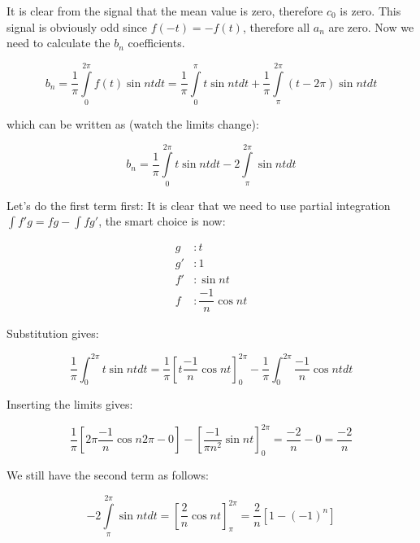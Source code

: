 \documentclass[11pt,letterpaper]{article}
\begin{document}
It is clear from the signal that the mean value is zero, therefore $c_0$ is zero. This signal is obviously odd since $f(-t) = -f(t)$, therefore all $a_n$ are zero. Now we need to calculate the $b_n$ coefficients.

\begin{equation}\label{HW_FourierSeries8}
 b_n = \frac{1}{\pi }\int\limits_{0}^{2\pi }{f\left( t \right)\sin ntdt} = \frac{1}{\pi}\int\limits_{0}^{\pi}{t \sin nt dt} + \frac{1}{\pi }\int\limits_{\pi}^{2\pi}{(t- 2 \pi) \sin nt dt}
\end{equation}

which can be written as (watch the limits change):

\begin{equation}\label{HW_FourierSeries9}
 b_n = \frac{1}{\pi}\int\limits_{0}^{2\pi}{t \sin nt dt} - 2\int\limits_{\pi}^{2\pi}{\sin nt dt}
\end{equation}

Let's do the first term first: It is clear that we need to use partial integration $\int f'g = fg - \int fg'$, the smart choice is now: 

\begin{align}\label{Eqn:HW_FourierSeries8}
g&:t\\
g'&: 1\\
f'&: \sin nt\\
f&: \dfrac{-1}{n} \cos nt
\end{align}

Substitution gives:

\begin{equation}\label{HW_FourierSeries10}
\dfrac{1}{\pi} \int_{0}^{2 \pi} t \sin nt dt = \dfrac{1}{\pi} \left[ t \dfrac{-1}{n} \cos nt \right]_0^{2\pi} - \dfrac{1}{\pi} \int_{0}^{2 \pi} \dfrac{-1}{n} \cos nt dt
\end{equation}

Inserting the limits gives:

\begin{equation}\label{HW_FourierSeries11}
\dfrac{1}{\pi} \left[ 2 \pi \dfrac{-1}{n} \cos n 2 \pi -0  \right] - \left[ \dfrac{-1}{\pi n^2} \sin nt  \right]_0^{2\pi} = \dfrac{-2}{n} -0 = \dfrac{-2}{n}  
\end{equation}

We still have the second term as follows:

\begin{equation}\label{HW_FourierSeries12}
 - 2\int\limits_{\pi}^{2\pi}{\sin nt dt} = \left[  \dfrac{2}{n}\cos nt \right]_\pi ^{2\pi} = \dfrac{2}{n}\left[ 1 - (-1)^n \right] 
\end{equation}
\end{document}
